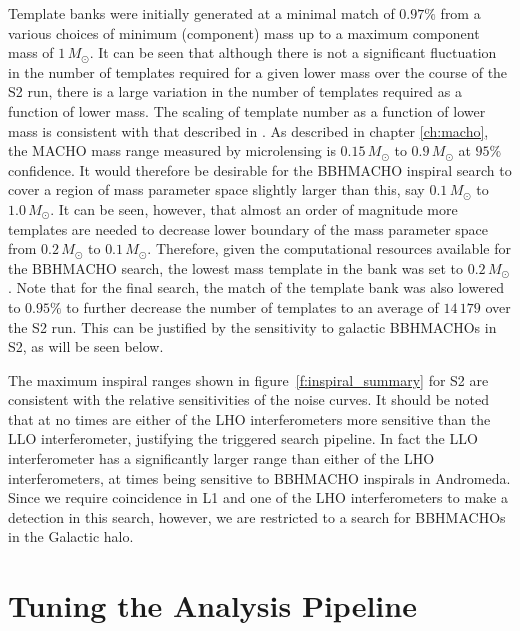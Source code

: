 Template banks were initially generated at a minimal match of $0.97\%$ from a
various choices of minimum (component) mass up to a maximum component mass of
$1\,M_\odot$. It can be seen that although there is not a significant
fluctuation in the number of templates required for a given lower mass over
the course of the S2 run, there is a large variation in the number of
templates required as a function of lower mass. The scaling of template number
as a function of lower mass is consistent with that described in
\cite{Owen:1998dk}. As described in chapter \ref{ch:macho}, the MACHO mass
range measured by microlensing is $0.15\,M_\odot$ to $0.9\,M_\odot$ at $95\%$
confidence. It would therefore be desirable for the BBHMACHO inspiral search
to cover a region of mass parameter space slightly larger than this, say
$0.1\,M_\odot$ to $1.0\,M_\odot$.  It can be seen, however, that almost an
order of magnitude more templates are needed to decrease lower boundary of
the mass parameter space from $0.2\,M_\odot$ to $0.1\,M_\odot$.  Therefore,
given the computational resources available for the BBHMACHO search, the
lowest mass template in the bank was set to $0.2\,M_\odot$. Note that for the
final search, the match of the template bank was also lowered to $0.95\%$ to
further decrease the number of templates to an average of $14\,179$ over the
S2 run. This can be justified by the sensitivity to galactic BBHMACHOs in S2,
as will be seen below.

The maximum inspiral ranges shown in figure~\ref{f:inspiral_summary} for S2
are consistent with the relative sensitivities of the noise curves. It should
be noted that at no times are either of the LHO interferometers more sensitive
than the LLO interferometer, justifying the triggered search pipeline. In fact
the LLO interferometer has a significantly larger range than either of the LHO
interferometers, at times being sensitive to BBHMACHO inspirals in Andromeda.
Since we require coincidence in L1 and one of the LHO interferometers to make
a detection in this search, however, we are restricted to a search for
BBHMACHOs in the Galactic halo.  

\section{Tuning the Analysis Pipeline}
\label{s:s2tuning}

